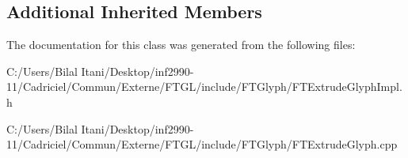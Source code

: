 \subsection*{Additional Inherited Members}


The documentation for this class was generated from the following files\+:\begin{DoxyCompactItemize}
\item 
C\+:/\+Users/\+Bilal Itani/\+Desktop/inf2990-\/11/\+Cadriciel/\+Commun/\+Externe/\+F\+T\+G\+L/include/\+F\+T\+Glyph/F\+T\+Extrude\+Glyph\+Impl.\+h\item 
C\+:/\+Users/\+Bilal Itani/\+Desktop/inf2990-\/11/\+Cadriciel/\+Commun/\+Externe/\+F\+T\+G\+L/include/\+F\+T\+Glyph/F\+T\+Extrude\+Glyph.\+cpp\end{DoxyCompactItemize}
